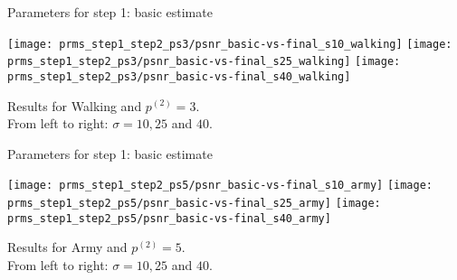 \documentclass[mathserif, 8pt]{beamer}
\begin{document}
\begin{frame}{Parameters for step 1: basic estimate}
	\begin{center}
		\texttt{[image: prms\_step1\_step2\_ps3/psnr\_basic-vs-final\_s10\_walking]}%
		\texttt{[image: prms\_step1\_step2\_ps3/psnr\_basic-vs-final\_s25\_walking]}%
		\texttt{[image: prms\_step1\_step2\_ps3/psnr\_basic-vs-final\_s40\_walking]}

		\bigskip

		Results for Walking and $p^{(2)} = 3$.\\From left to right: $\sigma = 10, 25$ and $40$.
	\end{center}
\end{frame}
\begin{frame}{Parameters for step 1: basic estimate}
	\begin{center}
		\texttt{[image: prms\_step1\_step2\_ps5/psnr\_basic-vs-final\_s10\_army]}%
		\texttt{[image: prms\_step1\_step2\_ps5/psnr\_basic-vs-final\_s25\_army]}%
		\texttt{[image: prms\_step1\_step2\_ps5/psnr\_basic-vs-final\_s40\_army]}

		\bigskip

		Results for Army and $p^{(2)} = 5$.\\From left to right: $\sigma = 10, 25$ and $40$.
	\end{center}
\end{frame}
\end{document}
